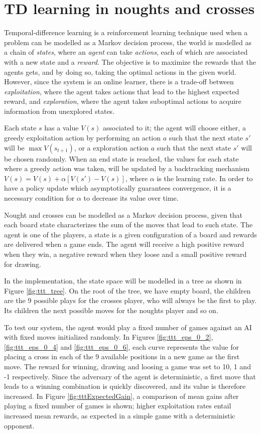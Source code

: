 \documentclass[12pt]{article}
\begin{document}
\section{TD learning in noughts and crosses}
\label{sec:td_ttt}

Temporal-difference learning\cite{Sutton1998} is a reinforcement learning technique used when a problem can be modelled as a Markov decision process, the world is modelled as a chain of \emph{states}, where an \emph{agent} can take \emph{actions}, each of which are associated with a new state and a \emph{reward}.
The objective is to maximize the rewards that the agents gets, and by doing so, taking the optimal actions in the given world.
However, since the system is an online learner, there is a trade-off between \emph{exploitation}, where the agent takes actions that lead to the highest expected reward, and \emph{exploration}, where the agent takes suboptimal actions to acquire information from unexplored states.

Each state $s$ has a value $V(s)$ associated to it; the agent will choose either, a greedy exploitation action by performing an action $a$ such that the next state $s'$  will be $\max V(s_{t + 1})$, or a exploration action $a$ such that the next state $s'$  will be chosen randomly.
When an end state is reached, the values for each state where a greedy action was taken, will be updated by a backtracking mechanism $V(s) = V(s) + \alpha \left[ V(s') - V(s) \right]$, where $\alpha$ is the learning rate.
In order to have a policy update which asymptotically guarantees convergence, it is a necessary condition for $\alpha$ to decrease its value over time.

Nought and crosses can be modelled as a Markov decision process, given that each board state characterizes the sum of the moves that lead to such state.
The agent is one of the players, a state is a given configuration of a board and rewards are delivered when a game ends.
The agent will receive a high positive reward when they win, a negative reward when they loose and a small positive reward for drawing.

In the implementation, the state space will be modelled in a tree as shown in Figure \ref{fig:ttt_tree}.
On the root of the tree, we have empty board, the children are the 9 possible plays for the crosses player, who will always be the first to play.
Its children the next possible moves for the noughts player and so on.

To test our system, the agent would play a fixed number of games against an AI with fixed moves initialized randomly.
In Figures \ref{fig:ttt_eps_0_2}, \ref{fig:ttt_eps_0_4} and \ref{fig:ttt_eps_0_6}, each curve represents the value for placing a cross in each of the 9 available positions in a new game as the first move.
The reward for winning, drawing and loosing a game was set to 10, 1 and -1 respectively.
Since the adversary of the agent is deterministic, a first move that leads to a winning combination is quickly discovered, and its value is therefore increased. 
In Figure \ref{fig:tttExpectedGain}, a comparison of mean gains after playing a fixed number of games is shown; higher exploitation rates entail increased mean rewards, as expected in a simple game with a deterministic opponent.
\end{document}
